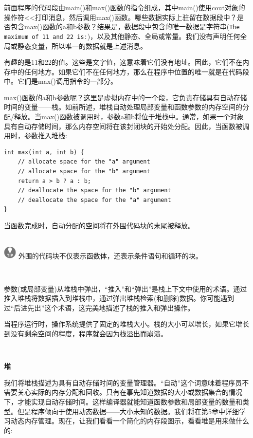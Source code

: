 前面程序的代码段由main()和max()函数的指令组成，其中main()使用cout对象的操作符<<打印消息，然后调用max()函数。哪些数据实际上驻留在数据段中？是否包含max()函数的a和b参数？结果是，数据段中包含的唯一数据是字符串(\texttt{The maximum of 11 and 22 is:})，以及其他静态、全局或常量。我们没有声明任何全局或静态变量，所以唯一的数据就是上述消息。\par
有趣的是11和22的值。这些是文字值，这意味着它们没有地址。因此，它们不在内存中的任何地方。如果它们不在任何地方，那么在程序中位置的唯一就是在代码段中。它们是max()调用指令的一部分。\par
max()函数的a和b参数呢？这里是虚拟内存中的一个段，它负责存储具有自动存储时间的变量——栈。如前所述，堆栈自动处理局部变量和函数参数的内存空间的分配/释放。当max()函数被调用时，参数a和b将位于堆栈中。通常，如果一个对象具有自动存储时间，那么内存空间将在该封闭块的开始处分配。因此，当函数被调用时，参数推入堆栈: \par

\begin{lstlisting}[caption={}]
int max(int a, int b) {
	// allocate space for the "a" argument
	// allocate space for the "b" argument
	return a > b ? a : b;
	// deallocate the space for the "b" argument
	// deallocate the space for the "a" argument
}
\end{lstlisting}

当函数完成时，自动分配的空间将在外围代码块的末尾被释放。 \par

\hspace*{\fill} \\ %
\includegraphics[width=0.05\textwidth]{images/tip}
外围的代码块不仅表示函数体，还表示条件语句和循环的块。 \par
\noindent\textbf{}\ \par

参数(或局部变量)从堆栈中弹出，“推入”和“弹出”是栈上下文中使用的术语。通过推入堆栈将数据插入到堆栈中，通过弹出堆栈检索(和删除)数据。你可能遇到过“后进先出”这个术语，这完美地描述了栈的推入和弹出操作。\par
当程序运行时，操作系统提供了固定的堆栈大小。栈的大小可以增长，如果它增长到没有剩余空间的程度，程序就会因为栈溢出而崩溃。 \par

\noindent\textbf{}\ \par
\textbf{堆} \ \par
我们将堆栈描述为具有自动存储时间的变量管理器。“自动”这个词意味着程序员不需要关心实际的内存分配和回收。只有在事先知道数据的大小或数据集合的情况下，才能实现自动存储时间。这样编译器就能知道函数参数和局部变量的数量和类型。但是程序倾向于使用动态数据——大小未知的数据。我们将在第5章中详细学习动态内存管理。现在，让我们看看一个简化的内存段图示，看看堆是用来做什么的:\par

